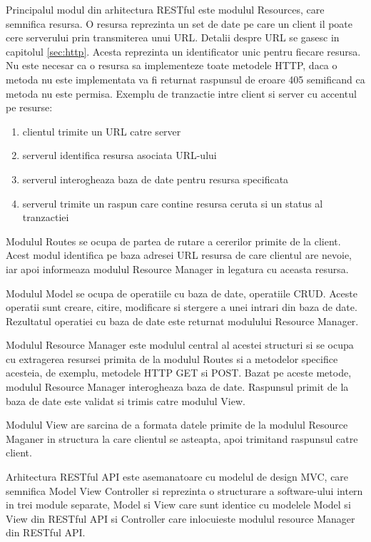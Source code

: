 Principalul modul din arhitectura RESTful este modulul Resources, care semnifica resursa. O resursa reprezinta un set de date pe care un client il poate 
cere serverului prin transmiterea unui URL. Detalii despre URL se gasesc in capitolul \ref{sec:http}. Acesta reprezinta un identificator unic pentru 
fiecare resursa. Nu este necesar ca o resursa sa implementeze toate metodele HTTP, daca o metoda nu este implementata va fi returnat raspunsul de eroare 
405 semificand ca metoda nu este permisa. Exemplu de tranzactie intre client si server cu accentul pe resurse:
\begin{enumerate}
	\item clientul trimite un URL catre server
	\item serverul identifica resursa asociata URL-ului
	\item serverul interogheaza baza de date pentru resursa specificata
	\item serverul trimite un raspun care contine resursa ceruta si un status al tranzactiei
\end{enumerate}

Modulul Routes se ocupa de partea de rutare a cererilor primite de la client. Acest modul identifica pe baza adresei URL resursa de care clientul are nevoie, 
iar apoi informeaza modulul Resource Manager in legatura cu aceasta resursa.

Modulul Model se ocupa de operatiile cu baza de date, operatiile CRUD. Aceste operatii sunt creare, citire, modificare si stergere a unei intrari din 
baza de date. Rezultatul operatiei cu baza de date este returnat modulului Resource Manager.

Modulul Resource Manager este modulul central al acestei structuri si se ocupa cu extragerea resursei primita de la modulul Routes si a metodelor specifice 
acesteia, de exemplu, metodele HTTP GET si POST. Bazat pe aceste metode, modulul Resource Manager interogheaza baza de date. Raspunsul primit de la baza de date 
este validat si trimis catre modulul View.

Modulul View are sarcina de a formata datele primite de la modulul Resource Maganer in structura la care clientul se asteapta, apoi trimitand raspunsul catre 
client. 

Arhitectura RESTful API este asemanatoare cu modelul de design MVC, care semnifica Model View Controller si reprezinta o structurare a software-ului intern 
in trei module separate, Model si View care sunt identice cu modelele Model si View din RESTful API si Controller care inlocuieste modulul resource Manager 
din RESTful API.


